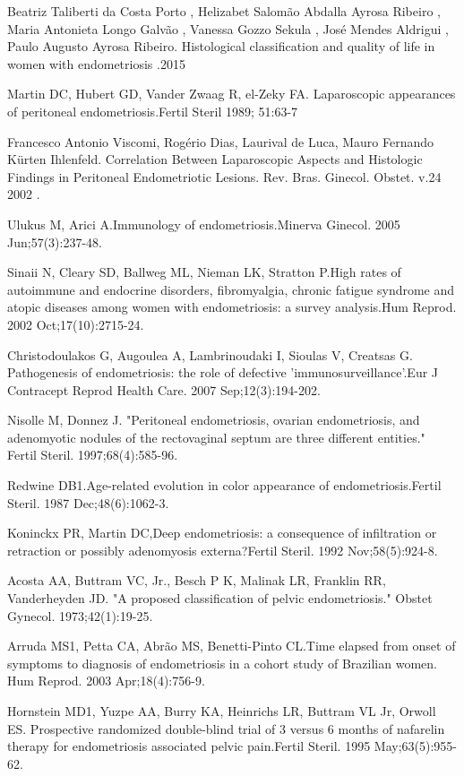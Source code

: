 \documentclass[12pt]{article} %
\begin{document}
Beatriz Taliberti da Costa Porto , Helizabet Salomão Abdalla Ayrosa Ribeiro , Maria Antonieta Longo Galvão , Vanessa Gozzo Sekula , José Mendes Aldrigui , Paulo Augusto Ayrosa Ribeiro.
Histological classification and quality of life in women with endometriosis .2015

Martin DC, Hubert GD, Vander Zwaag R, el-Zeky FA. Laparoscopic appearances of peritoneal endometriosis.Fertil Steril 1989; 51:63-7

Francesco Antonio Viscomi, Rogério Dias, Laurival de Luca, Mauro Fernando Kürten Ihlenfeld. Correlation Between Laparoscopic Aspects and Histologic Findings in Peritoneal Endometriotic Lesions. Rev. Bras. Ginecol. Obstet. v.24 2002 .

Ulukus M, Arici A.Immunology of endometriosis.Minerva Ginecol. 2005 Jun;57(3):237-48.

Sinaii N, Cleary SD, Ballweg ML, Nieman LK, Stratton P.High rates of autoimmune and endocrine disorders, fibromyalgia, chronic fatigue syndrome and atopic diseases among women with endometriosis: a survey analysis.Hum Reprod. 2002 Oct;17(10):2715-24.

Christodoulakos G, Augoulea A, Lambrinoudaki I, Sioulas V, Creatsas G. Pathogenesis of endometriosis: the role of defective 'immunosurveillance'.Eur J Contracept Reprod Health Care. 2007 Sep;12(3):194-202.

Nisolle M, Donnez J. "Peritoneal endometriosis, ovarian endometriosis, and
adenomyotic nodules of the rectovaginal septum are three different entities."
Fertil Steril. 1997;68(4):585-96.

Redwine DB1.Age-related evolution in color appearance of endometriosis.Fertil Steril. 1987 Dec;48(6):1062-3.

Koninckx PR, Martin DC,Deep endometriosis: a consequence of infiltration or retraction or possibly adenomyosis externa?Fertil Steril. 1992 Nov;58(5):924-8.

Acosta AA, Buttram VC, Jr., Besch P K, Malinak LR, Franklin RR,
Vanderheyden JD. "A proposed classification of pelvic endometriosis."
Obstet Gynecol. 1973;42(1):19-25.


Arruda MS1, Petta CA, Abrão MS, Benetti-Pinto CL.Time elapsed from onset of symptoms to diagnosis of endometriosis in a cohort study of Brazilian women. Hum Reprod. 2003 Apr;18(4):756-9.

Hornstein MD1, Yuzpe AA, Burry KA, Heinrichs LR, Buttram VL Jr, Orwoll ES. Prospective randomized double-blind trial of 3 versus 6 months of nafarelin therapy for endometriosis associated pelvic pain.Fertil Steril. 1995 May;63(5):955-62.
\end{document}
